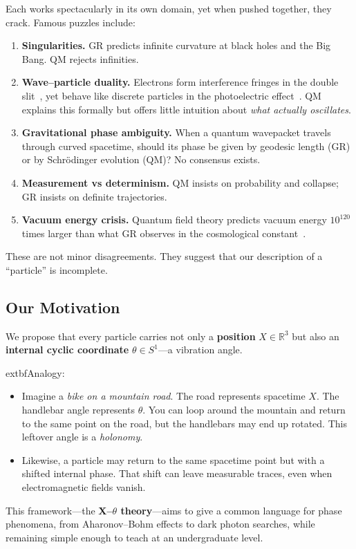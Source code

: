 Each works spectacularly in its own domain, yet when pushed together, they crack. Famous puzzles include:

\begin{enumerate}
	\item \textbf{Singularities.} GR predicts infinite curvature at black holes and the Big Bang. QM rejects infinities.
	\item \textbf{Wave--particle duality.} Electrons form interference fringes in the double slit~\cite{FeynmanDoubleSlit}, yet behave like discrete particles in the photoelectric effect~\cite{EinsteinPhotoelectric}. QM explains this formally but offers little intuition about \emph{what actually oscillates}.
	\item \textbf{Gravitational phase ambiguity.} When a quantum wavepacket travels through curved spacetime, should its phase be given by geodesic length (GR) or by Schr\"odinger evolution (QM)? No consensus exists.
	\item \textbf{Measurement vs determinism.} QM insists on probability and collapse; GR insists on definite trajectories.
	\item \textbf{Vacuum energy crisis.} Quantum field theory predicts vacuum energy $10^{120}$ times larger than what GR observes in the cosmological constant~\cite{VacuumEnergyCrisis}.
\end{enumerate}

These are not minor disagreements. They suggest that our description of a ``particle'' is incomplete.

\subsection*{Our Motivation}

We propose that every particle carries not only a \textbf{position} $X\in\mathbb{R}^3$ but also an \textbf{internal cyclic coordinate} $\theta \in S^1$---a vibration angle.

	extbf{Analogy:}
\begin{itemize}
	\item Imagine a \emph{bike on a mountain road}. The road represents spacetime $X$. The handlebar angle represents $\theta$. You can loop around the mountain and return to the same point on the road, but the handlebars may end up rotated. This leftover angle is a \emph{holonomy}.
	\item Likewise, a particle may return to the same spacetime point but with a shifted internal phase. That shift can leave measurable traces, even when electromagnetic fields vanish.
\end{itemize}

This framework---the \textbf{X--$\theta$ theory}---aims to give a common language for phase phenomena, from Aharonov--Bohm effects to dark photon searches, while remaining simple enough to teach at an undergraduate level.

